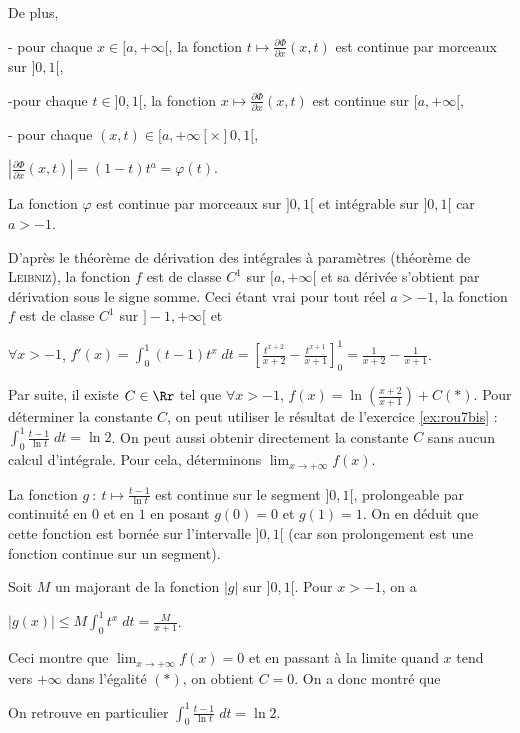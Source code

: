 {{De plus,

- pour chaque $x\in[a,+\infty[$, la fonction $t\mapsto\frac{\partial \Phi}{\partial x}(x,t)$ est continue par morceaux sur $]0,1[$,

-pour chaque $t\in]0,1[$, la fonction $x\mapsto\frac{\partial \Phi}{\partial x}(x,t)$ est continue sur $[a,+\infty[$,

- pour chaque $(x,t)\in[a,+\infty[\times]0,1[$,

\begin{center}
$\left|\frac{\partial \Phi}{\partial x}(x,t)\right|=(1-t)t^a=\varphi(t)$.
\end{center}

La fonction $\varphi$ est continue par morceaux sur $]0,1[$ et intégrable sur $]0,1[$ car $a>-1$.

D'après le théorème de dérivation des intégrales à paramètres (théorème de \textsc{Leibniz}), la fonction $f$ est de classe $C^1$ sur $[a,+\infty[$ et sa dérivée s'obtient par dérivation sous le signe somme. Ceci étant vrai pour tout réel $a>-1$, la fonction $f$ est de classe $C^1$ sur $]-1,+\infty[$ et

\begin{center}
$\forall x>-1$, $f'(x)=\int_{0}^{1}(t-1)t^x\;dt=\left[\frac{t^{x+2}}{x+2}-\frac{t^{x+1}}{x+1}\right]_0^1=\frac{1}{x+2}-\frac{1}{x+1}$.
\end{center}

Par suite, il existe $C\in\Rr$ tel que $\forall x>-1$, $f(x)=\ln\left(\frac{x+2}{x+1}\right)+C$\quad$(*)$. Pour déterminer la constante $C$, on peut utiliser le résultat de l'exercice \ref{ex:rou7bis} : $\int_{0}^{1}\frac{t-1}{\ln t}\;dt=\ln2$. On peut aussi obtenir directement la constante $C$ sans aucun calcul d'intégrale. Pour cela, déterminons $\lim_{x \rightarrow +\infty}f(x)$.

La fonction $g~:~t\mapsto\frac{t-1}{\ln t}$ est continue sur le segment $]0,1[$, prolongeable par continuité en $0$ et en $1$ en posant $g(0)=0$ et $g(1)=1$. On en déduit que cette fonction est bornée sur l'intervalle $]0,1[$ (car son prolongement est une fonction continue sur un segment).

Soit $M$ un majorant de la fonction $|g|$ sur $]0,1[$. Pour $x>-1$, on a

\begin{center}
$|g(x)|\leqslant M\int_{0}^{1}t^x\;dt=\frac{M}{x+1}$.
\end{center}

Ceci montre que $\lim_{x \rightarrow +\infty}f(x)=0$ et en passant à la limite quand $x$ tend vers $+\infty$ dans l'égalité $(*)$, on obtient $C=0$. On a donc montré que

\begin{center}
\end{center}

On retrouve en particulier $\int_{0}^{1}\frac{t-1}{\ln t}\;dt=\ln2$.
}
}

